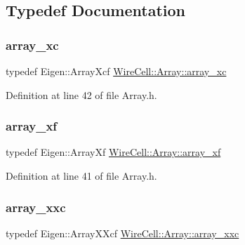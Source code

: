 \subsection{Typedef Documentation}
\mbox{\label{namespace_wire_cell_1_1_array_aa3b8841eb0edb05008f49e62484eac89}} 
\subsubsection{\texorpdfstring{array\+\_\+xc}{array\_xc}}
{\footnotesize\ttfamily typedef Eigen\+::\+Array\+Xcf \hyperlink{namespace_wire_cell_1_1_array_aa3b8841eb0edb05008f49e62484eac89}{Wire\+Cell\+::\+Array\+::array\+\_\+xc}}



Definition at line 42 of file Array.\+h.

\mbox{\label{namespace_wire_cell_1_1_array_ac1868a05b1fe180d6323674e8b5a3db9}} 
\subsubsection{\texorpdfstring{array\+\_\+xf}{array\_xf}}
{\footnotesize\ttfamily typedef Eigen\+::\+Array\+Xf \hyperlink{namespace_wire_cell_1_1_array_ac1868a05b1fe180d6323674e8b5a3db9}{Wire\+Cell\+::\+Array\+::array\+\_\+xf}}



Definition at line 41 of file Array.\+h.

\mbox{\label{namespace_wire_cell_1_1_array_a4688507545975422d74b9ba78530956a}} 
\subsubsection{\texorpdfstring{array\+\_\+xxc}{array\_xxc}}
{\footnotesize\ttfamily typedef Eigen\+::\+Array\+X\+Xcf \hyperlink{namespace_wire_cell_1_1_array_a4688507545975422d74b9ba78530956a}{Wire\+Cell\+::\+Array\+::array\+\_\+xxc}}



